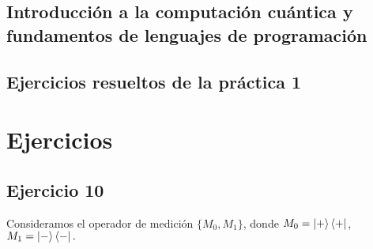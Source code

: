 \documentclass[a4paper,11pt]{article}
\title{}
\author{}
\begin{document}
\maketitle 

\thispagestyle{empty}
\begin{center}
\section*{Introducción a  la computación cuántica y fundamentos de lenguajes de programación} 
\subsection*{Ejercicios resueltos de la práctica 1}

\end{center}

\newpage{\pagestyle{empty}\cleardoublepage}

\newpage


\section{Ejercicios}

\subsection*{Ejercicio 10}
Consideramos el operador de medición $\{ M_{0}, M_{1}\}$, donde $M_{0}=\ket{+}\bra{+}$, $M_{1}=\ket{-}\bra{-}.$
\end{document}
